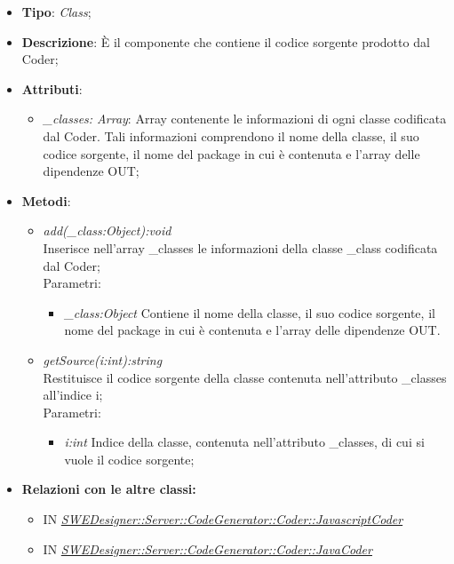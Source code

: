 \documentclass[../DefinizioneDiProdotto.tex]{subfiles}
\begin{document}
			\begin{itemize}
				\item \textbf{Tipo}: \emph{Class};
				\item \textbf{Descrizione}: È il componente che contiene il codice sorgente prodotto dal Coder; \\
				\item \textbf{Attributi}:
				\begin{itemize}
					\item \emph{\_classes: Array}: Array contenente le informazioni di ogni classe codificata dal Coder. Tali informazioni comprendono il nome della classe, il suo codice sorgente, il nome del package in cui è contenuta e l'array delle dipendenze OUT;
				\end{itemize}
				\item \textbf{Metodi}:
				\begin{itemize}
					\item \emph{add(\_class:Object):void} \\ 
					Inserisce nell'array \_classes le informazioni della classe \_class codificata dal Coder; \\
					Parametri:
					\begin{itemize}
						\item \emph{\_class:Object} Contiene il nome della classe, il suo codice sorgente, il nome del package in cui è contenuta e l'array delle dipendenze OUT.
					\end{itemize}
					
					\item \emph{getSource(i:int):string} \\ 
					Restituisce il codice sorgente della classe contenuta nell'attributo \_classes all'indice i; \\
					Parametri:
					\begin{itemize}
						\item \emph{i:int} Indice della classe, contenuta nell'attributo \_classes, di cui si vuole il codice sorgente;
					\end{itemize}
				\end{itemize}
				
				\item \textbf{Relazioni con le altre classi:}
				\begin{itemize}
					\item IN \hyperlink{SWEDesigner::Server::CodeGenerator::Coder::JavascriptCoder}{\emph{SWEDesigner::Server::CodeGenerator::Coder::JavascriptCoder}}
					\item IN \hyperlink{SWEDesigner::Server::CodeGenerator::Coder::JavaCoder}{\emph{SWEDesigner::Server::CodeGenerator::Coder::JavaCoder}}
				\end{itemize}	
			\end{itemize}
			
\end{document}
